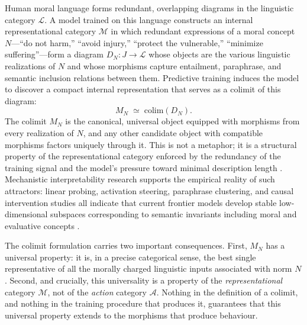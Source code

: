 \documentclass[12pt]{article}
\theoremstyle{definition}
\begin{document}
Human moral language forms redundant, overlapping diagrams in the linguistic
category $\mathcal{L}$. A model trained on this language constructs an internal
representational category $\mathcal{M}$ in which redundant expressions of a
moral concept $N$---``do not harm,'' ``avoid injury,'' ``protect the
vulnerable,'' ``minimize suffering''---form a diagram $D_N : J \to \mathcal{L}$
whose objects are the various linguistic realizations of $N$ and whose morphisms
capture entailment, paraphrase, and semantic inclusion relations between them.
Predictive training induces the model to discover a compact internal
representation that serves as a colimit of this diagram:
\begin{equation}
  M_N \;\simeq\; \mathrm{colim}(D_N).
\end{equation}
The colimit $M_N$ is the canonical, universal object equipped with morphisms
from every realization of $N$, and any other candidate object with compatible
morphisms factors uniquely through it. This is not a metaphor; it is a
structural property of the representational category enforced by the redundancy
of the training signal and the model's pressure toward minimal description
length \citep{tishby1999}. Mechanistic interpretability research supports the
empirical reality of such attractors: linear probing, activation steering,
paraphrase clustering, and causal intervention studies all indicate that current
frontier models develop stable low-dimensional subspaces corresponding to
semantic invariants including moral and evaluative concepts \citep{burns2022,
elhage2022}.

The colimit formulation carries two important consequences. First, $M_N$ has a
universal property: it is, in a precise categorical sense, the best single
representative of all the morally charged linguistic inputs associated with
norm $N$. Second, and crucially, this universality is a property of the
\emph{representational} category $\mathcal{M}$, not of the \emph{action}
category $\mathcal{A}$. Nothing in the definition of a colimit, and nothing in
the training procedure that produces it, guarantees that this universal
property extends to the morphisms that produce behaviour.
\end{document}
